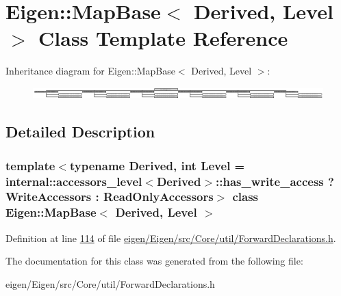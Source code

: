 \hypertarget{class_eigen_1_1_map_base}{}\section{Eigen\+:\+:Map\+Base$<$ Derived, Level $>$ Class Template Reference}
\label{class_eigen_1_1_map_base}
Inheritance diagram for Eigen\+:\+:Map\+Base$<$ Derived, Level $>$\+:\begin{figure}[H]
\begin{center}
\leavevmode
\includegraphics[height=0.435120cm]{class_eigen_1_1_map_base}
\end{center}
\end{figure}


\subsection{Detailed Description}
\subsubsection*{template$<$typename Derived, int Level = internal\+::accessors\+\_\+level$<$\+Derived$>$\+::has\+\_\+write\+\_\+access ? Write\+Accessors \+: Read\+Only\+Accessors$>$\newline
class Eigen\+::\+Map\+Base$<$ Derived, Level $>$}



Definition at line \hyperlink{eigen_2_eigen_2src_2_core_2util_2_forward_declarations_8h_source_l00114}{114} of file \hyperlink{eigen_2_eigen_2src_2_core_2util_2_forward_declarations_8h_source}{eigen/\+Eigen/src/\+Core/util/\+Forward\+Declarations.\+h}.



The documentation for this class was generated from the following file\+:\begin{DoxyCompactItemize}
\item 
eigen/\+Eigen/src/\+Core/util/\+Forward\+Declarations.\+h\end{DoxyCompactItemize}
